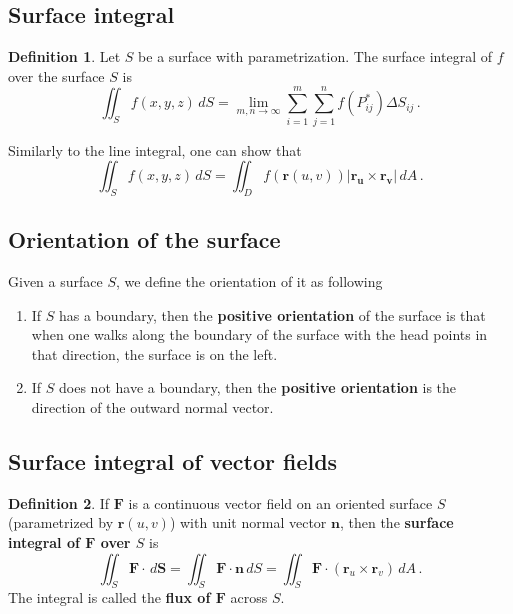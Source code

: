 \documentclass[
]{book}
\theoremstyle{definition}
\newtheorem{definition}{Definition}[chapter]
\theoremstyle{definition}
\theoremstyle{definition}
\theoremstyle{definition}
\theoremstyle{remark}
\begin{document}
\hypertarget{surface-integral}{%
\subsection{Surface integral}\label{surface-integral}}

\begin{definition}
Let \(S\) be a surface with parametrization.
The surface integral of \(f\) over the surface \(S\) is
\begin{equation*}
    \iint_S f(x,y,z) \, dS = \lim_{m,n\to \infty} \sum_{i=1}^m \sum_{j=1}^n f(P_{ij}^*) \Delta S_{ij} \,.
\end{equation*}
\end{definition}

Similarly to the line integral,
one can show that
\begin{equation*}
   \iint_S f(x,y,z) \, dS  = \iint_D f(\mathbf{r}(u,v)) | \mathbf{r_u}\times \mathbf{r_v} | \, dA \,. 
\end{equation*}

\hypertarget{orientation-of-the-surface}{%
\subsection{Orientation of the surface}\label{orientation-of-the-surface}}

Given a surface \(S\), we define the orientation of it as following

\begin{enumerate}
\def\labelenumi{\arabic{enumi}.}
\item
  If \(S\) has a boundary, then the \textbf{positive orientation} of the surface is that
  when one walks along the boundary of the surface with the head points in that direction, the surface is on the left.
\item
  If \(S\) does not have a boundary, then the \textbf{positive orientation} is the direction of the outward normal vector.
\end{enumerate}

\hypertarget{surface-integral-of-vector-fields}{%
\subsection{Surface integral of vector fields}\label{surface-integral-of-vector-fields}}

\begin{definition}
If \(\mathbf{F}\) is a continuous vector field on an oriented surface \(S\) (parametrized by \(\mathbf{r}(u,v)\))
with unit normal vector \(\mathbf{n}\), then the \textbf{surface integral of \(\mathbf{F}\) over
\(S\)} is
\begin{equation*}
    \iint_S \mathbf{F}\cdot \, d\mathbf{S} = \iint_S \mathbf{F}\cdot \mathbf{n} \, dS 
    = \iint_S \mathbf{F}\cdot (\mathbf{r}_u\times \mathbf{r}_v) \, dA \,.
\end{equation*}
The integral is called the \textbf{flux of \(\mathbf{F}\)} across \(S\).
\end{definition}
\end{document}
